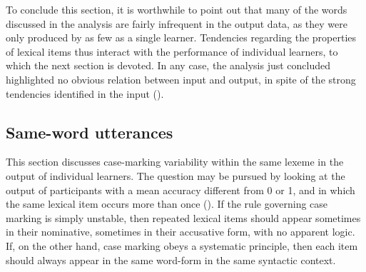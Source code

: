 To conclude this section, it is worthwhile to point out that many of the words discussed in the analysis are fairly infrequent in the output data, as they were only produced by as few as a single learner. Tendencies regarding the properties of lexical items thus interact with the performance of individual learners, to which the next section is devoted. In any case, the analysis just concluded highlighted no obvious relation between input and output, in spite of the strong tendencies identified in the input ().

\subsection{Same-word utterances}\label{sec:07:2.2}

This section discusses case-marking variability within the same lexeme in the output of individual learners. The question may be pursued by looking at the output of participants with a mean accuracy different from 0 or 1, and in which the same lexical item occurs more than once (). If the rule governing case marking is simply unstable, then repeated lexical items should appear sometimes in their nominative, sometimes in their accusative form, with no apparent logic. If, on the other hand, case marking obeys a systematic principle, then each item should always appear in the same word-form in the same syntactic context.

